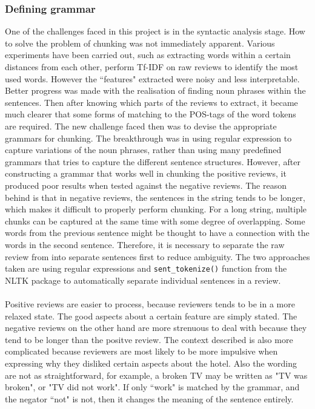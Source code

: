 \documentclass[a4paper]{report}
\newcommand{\code}[1]{\texttt{#1}}
\begin{document}
{{\subsubsection{Defining grammar}
One of the challenges faced in this project is in the syntactic analysis stage. How to solve the problem of chunking was not immediately apparent. Various experiments have been carried out, such as extracting words within a certain distances from each other, perform Tf-IDF on raw reviews to identify the most used words. However the “features" extracted were noisy and less interpretable. Better progress was made with the realisation of finding noun phrases within the sentences. Then after knowing which parts of the reviews to extract, it became much clearer that some forms of matching to the POS-tags of the word tokens are required. The new challenge faced then was to devise the appropriate grammars for chunking. The breakthrough was in using regular expression to capture variations of the noun phrases, rather than using many predefined grammars that tries to capture the different sentence structures. However, after constructing a grammar that works well in chunking the positive reviews, it produced poor results when tested against the negative reviews. The reason behind is that in negative reviews, the sentences in the string tends to be longer, which makes it difficult to properly perform chunking. For a long string, multiple chunks can be captured at the same time with some degree of overlapping. Some words from the previous sentence might be thought to have a connection with the words in the second sentence. Therefore, it is necessary to separate the raw review from into separate sentences first to reduce ambiguity. The two approaches taken are using regular expressions and \code{sent\_tokenize()} function from the NLTK package to automatically separate individual sentences in a review.
\\\\
Positive reviews are easier to process, because reviewers tends to be in a more relaxed state. The good aspects about a certain feature are simply stated. The negative reviews on the other hand are more strenuous to deal with because they tend to be longer than the positve review. The context described is also more complicated because reviewers are most likely to be more impulsive when expressing why they disliked certain aspects about the hotel. Also the wording are not as straightforward, for example, a broken TV may be written as "TV was broken", or "TV did not work". If only ``work" is matched by the grammar, and the negator ``not" is not, then it changes the meaning of the sentence entirely. 

}}
\end{document}
